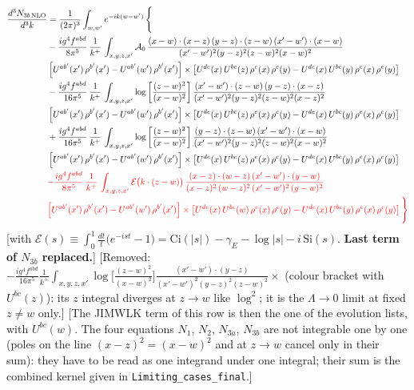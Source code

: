 \documentclass[9pt]{article}
\numberwithin{equation}{section}
\begin{document}
\begin{align}
\frac{d^{3}N_{3b\,\rm NLO}}{d^{3}k} & = \frac{1}{(2\pi)^{3}}\int_{w,w'}e^{-ik(w-w')}\,\Bigg\{\notag \\
&-\frac{ig^{4}f^{abd}}{8\pi^{5}}\,\frac{1}{k^{+}}\,\int_{x,y,z,x'}\mathcal{A}_{0}\,
\frac{(x-w)\cdot(x-z)\,(y-z)\cdot(z-w)\,(x'-w')\cdot(x-w)}{(x'-w')^{2}(y-z)^{2}(z-w)^{2}(x-w)^{2}}\notag \\ & \left[U^{ab'}(x')\,\rho^{b'}(x')-U^{ab'}(w')\, \rho^{b'}(x')\right]\times \left[U^{de}(x)\,U^{bc}(z)\, \rho^{e}(x)\,\rho^{c}(y)-U^{de}(x)\,U^{bc}(y)\,\rho^{e}(x)\,\rho^{c}(y)\right] \notag \\
& -\frac{ig^{4}f^{abd}}{16\pi^{5}}\,\frac{1}{k^{+}}\,\int_{x,y,z,x'}\log{\left[\frac{(z-w)^{2}}{(x-w)^{2}}\right]}\,
\frac{(x'-w')\cdot(z-w)\,(y-z)\cdot(x-z)}{(x'-w')^{2}(y-z)^{2}(z-w)^{2}(x-z)^{2}}\notag \\
&\left[U^{ab'}(x')\,\rho^{b'}(x')-U^{ab'}(w')\, \rho^{b'}(x')\right]\times \left[U^{de}(x)\,U^{bc}(z)\, \rho^{e}(x)\,\rho^{c}(y)-U^{de}(x)\,U^{bc}(y)\,\rho^{e}(x)\,\rho^{c}(y)\right] \notag \\
&+ \frac{ig^{4}f^{abd}}{16\pi^{5}}\,\frac{1}{k^{+}}\,\int_{x,y,z,x'}\log{\left[\frac{(z-w)^{2}}{(x-w)^{2}}\right]}\,
\frac{(y-z)\cdot(z-w)\,(x'-w')\cdot(x-w)}{(x'-w')^{2}(y-z)^{2}(z-w)^{2}(x-w)^{2}}\notag \\ 
& \left[U^{ab'}(x')\,\rho^{b'}(x')-U^{ab'}(w')\, \rho^{b'}(x')\right]\times \left[U^{de}(x)\,U^{bc}(z)\, \rho^{e}(x)\,\rho^{c}(y)-U^{de}(x)\,U^{bc}(y)\,\rho^{e}(x)\,\rho^{c}(y)\right]\notag \\ & {\color{red}-\frac{ig^{4}f^{abd}}{8\pi^{5}}\,\frac{1}{k^{+}}\,\int_{x,y,z,x'}\mathcal{E}\big(k\cdot(z-w)\big)\,\frac{(x-z)\cdot(w-z)\,(x'-w')\cdot(y-w)}{(x-z)^{2}\,(w-z)^{2}\,(x'-w')^{2}\,(y-w)^{2}}}\notag \\ & {\color{red}\left[U^{ab'}(x')\,\rho^{b'}(x')-U^{ab'}(w')\, \rho^{b'}(x')\right]\times \left[U^{de}(x)\,U^{bc}(w)\, \rho^{e}(x)\,\rho^{c}(y)-U^{de}(x)\,U^{bc}(y)\,\rho^{e}(x)\,\rho^{c}(y)\right]\Bigg\}}
\end{align} {\color{red}[with $\mathcal{E}(s)\equiv\int_{0}^{1}\frac{dt}{t}\big(e^{-ist}-1\big)=\mathrm{Ci}(|s|)-\gamma_{E}-\log|s|-i\,\mathrm{Si}(s)$. \textbf{Last term of $N_{3b}$ replaced.}]} {\color{orange}[Removed: $-\frac{ig^{4}f^{abd}}{16\pi^{5}}\frac{1}{k^{+}}\int_{x,y,z,x'}\log\big[\frac{(z-w)^{2}}{(x-w)^{2}}\big]\frac{(x'-w')\cdot(y-z)}{(x'-w')^{2}(y-z)^{2}(z-w)^{2}}\times$ (colour bracket with $U^{bc}(z)$): its $z$ integral diverges at $z\to w$ like $\log^{2}$; it is the $\Lambda\to0$ limit at fixed $z\neq w$ only.]} {\color{red}[The JIMWLK term of this row is then the one of the evolution lists, with $U^{bc}(w)$. The four equations $N_{1}$, $N_{2}$, $N_{3a}$, $N_{3b}$ are not integrable one by one (poles on the line $(x-z)^{2}=(x-w)^{2}$ and at $z\to w$ cancel only in their sum): they have to be read as one integrand under one integral; their sum is the combined kernel given in \texttt{Limiting\_cases\_final}.]}\par\noindent
\end{document}
